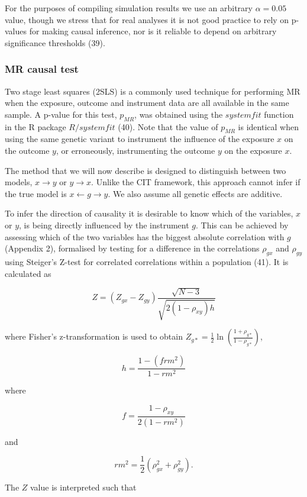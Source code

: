 \documentclass[]{article}
\begin{document}
For the purposes of compiling simulation results we use an arbitrary
\(\alpha = 0.05\) value, though we stress that for real analyses it is
not good practice to rely on p-values for making causal inference, nor
is it reliable to depend on arbitrary significance thresholds (39).

\subsubsection{MR causal test}\label{mr-causal-test}

Two stage least squares (2SLS) is a commonly used technique for
performing MR when the exposure, outcome and instrument data are all
available in the same sample. A p-value for this test, \(p_{MR}\), was
obtained using the \(systemfit\) function in the R package
\(R/systemfit\) (40). Note that the value of \(p_{MR}\) is identical
when using the same genetic variant to instrument the influence of the
exposure \(x\) on the outcome \(y\), or erroneously, instrumenting the
outcome \(y\) on the exposure \(x\).

The method that we will now describe is designed to distinguish between
two models, \(x \rightarrow y\) or \(y \rightarrow x\). Unlike the CIT
framework, this approach cannot infer if the true model is
\(x \leftarrow g \rightarrow y\). We also assume all genetic effects are
additive.

To infer the direction of causality it is desirable to know which of the
variables, \(x\) or \(y\), is being directly influenced by the
instrument \(g\). This can be achieved by assessing which of the two
variables has the biggest absolute correlation with \(g\) (Appendix 2),
formalised by testing for a difference in the correlations \(\rho_{gx}\)
and \(\rho_{gy}\) using Steiger's Z-test for correlated correlations
within a population (41). It is calculated as

\[
Z = (Z_{gx} - Z_{gy}) \frac{\sqrt{N-3}}{\sqrt{2(1-\rho_{xy})h}}
\]

where Fisher's z-transformation is used to obtain
\(Z_{g*} = \frac{1}{2} \ln \left ( \frac{1+\rho_{g*}}{1-\rho_{g*}} \right )\),

\[
h = \frac{1 - (frm^2)} {1 - rm^2}
\]

where

\[
f = \frac{1 - \rho_{xy}}{2(1 - rm^2)}
\]

and

\[
rm^2 = \frac{1}{2}(\rho_{gx}^2 + \rho_{gy}^2).
\]

The \(Z\) value is interpreted such that
\end{document}
